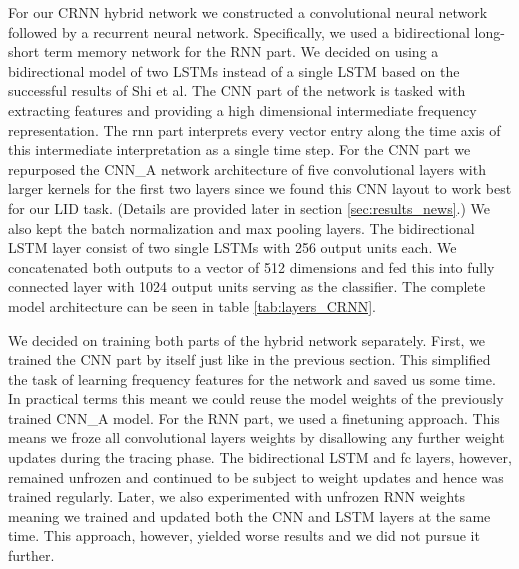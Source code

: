 For our CRNN hybrid network we constructed a convolutional neural network followed by a recurrent neural network. Specifically, we used a bidirectional long-short term memory network for the RNN part. We decided on using a bidirectional model of two LSTMs instead of a single LSTM based on the successful results of Shi et al\cite{shi2016end}. The CNN part of the network is tasked with extracting features and providing a high dimensional intermediate frequency representation. The \ac{rnn} part interprets every vector entry along the time axis of this intermediate interpretation as a single time step.
For the CNN part we repurposed the CNN\_A network architecture of five convolutional layers with larger kernels for the first two layers since we found this CNN layout to work best for our LID task. (Details are provided later in section \ref{sec:results_news}.) We also kept the batch normalization and max pooling layers. The bidirectional LSTM layer consist of two single LSTMs with 256 output units each. We concatenated both outputs to a vector of 512 dimensions and fed this into fully connected layer with 1024 output units serving as the classifier. The complete model architecture can be seen in table \ref{tab:layers_CRNN}. 

We decided on training both parts of the hybrid network separately. First, we trained the CNN part by itself just like in the previous section. This simplified the task of learning frequency features for the network and saved us some time. In practical terms this meant we could reuse the model weights of the previously trained CNN\_A model. For the RNN part, we used a finetuning approach. This means we froze all convolutional layers weights by disallowing any further weight updates during the tracing phase. The bidirectional LSTM and \ac{fc} layers, however, remained unfrozen and continued to be subject to weight updates and hence was trained regularly. Later, we also experimented with unfrozen RNN weights meaning we trained and updated both the CNN and LSTM layers at the same time. This approach, however, yielded worse results and we did not pursue it further.

